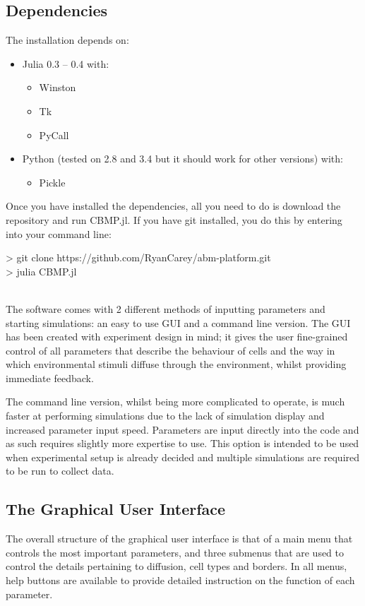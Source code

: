 \documentclass[12pt]{article}
\begin{document}
\subsection{Dependencies}

The installation depends on:

\begin{itemize}
\item Julia 0.3 -- 0.4 with:
\begin{itemize}
\item Winston
\item Tk
\item PyCall
\end{itemize}
\item Python (tested on 2.8 and 3.4 but it should work for other 
versions) with:
\begin{itemize}
\item Pickle
\end{itemize}
\end{itemize}

Once you have installed the dependencies, all you need to do is download 
the repository and run CBMP.jl. If you have git installed, you do this 
by entering into your command line: \\

{\fontsize{11pt}{11pt} \ttfamily 

> git clone https://github.com/RyanCarey/abm-platform.git \\

> julia CBMP.jl} \\

The software comes with 2 different methods of inputting parameters and 
starting simulations: an easy to use GUI and a command line version. The 
GUI has been created with experiment design in mind; it gives the user 
fine-grained control of all parameters that describe the behaviour of 
cells and the way in which environmental stimuli diffuse through the 
environment, whilst providing immediate feedback.

The command line version, whilst being more complicated to operate, is 
much faster at performing simulations due to the lack of simulation 
display and increased parameter input speed. Parameters are input 
directly into the code and as such requires slightly more expertise to 
use. This option is intended to be used when experimental setup is 
already decided and multiple simulations are required to be run to 
collect data.

\subsection{The Graphical User Interface}
The overall structure of the graphical user interface is that of a main 
menu that controls the most important parameters, and three submenus 
that are used to control the details pertaining to diffusion, cell types 
and borders. In all menus, help buttons are available to provide 
detailed instruction on the function of each parameter.
\end{document}
